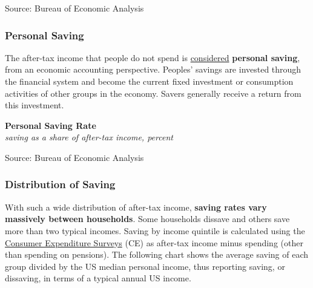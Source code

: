 \documentclass{report}
\makeatletter
\newcommand{\tbllink}[1]{\href{https://raw.githubusercontent.com/bdecon/US-chartbook/master/chartbook/data/#1}{\faTable}}
\newcommand*\short[1]{\expandafter\@gobbletwo\number\numexpr#1\relax}
\newcommand{\dateaxisticks}{
		date coordinates in=x, axis line style={draw=none},
		xmax={2023-10-01},
		max space between ticks=40,	    
		xtick={{1990-01-01}, {1992-01-01}, {1994-01-01}, 
			{1996-01-01}, {1998-01-01}, {2000-01-01}, 
			{2002-01-01}, {2004-01-01}, {2006-01-01},
			{2008-01-01}, {2010-01-01}, {2012-01-01}, {2014-01-01},
		    {2016-01-01}, {2018-01-01}, {2020-01-01}, {2022-01-01}, 
		    {2024-01-01}, {2026-01-01}},
		minor xtick={{1989-01-01}, {1991-01-01}, {1993-01-01},
			{1995-01-01}, {1997-01-01}, {1999-01-01}, 
			{2001-01-01}, {2003-01-01}, {2005-01-01}, {2007-01-01},
		    {2009-01-01}, {2011-01-01}, {2013-01-01}, {2015-01-01},
		    {2017-01-01}, {2019-01-01}, {2021-01-01}, {2023-01-01}, 
		    {2025-01-01}, {2027-01-01}},
		enlarge y limits={0.06}, enlarge x limits={0.01},
		}
\newcommand{\bbar}[2]{extra #1 ticks = {{#2}}, extra #1 tick labels = ,
		extra #1 tick style = {grid=major, grid style={thick, black!25}},}
\newcommand{\stdline}[4]{\addplot[very thick, no markers, color=#1] 
		table [x=#2, y=#3, col sep=comma] {#4};	}
\newcommand{\rbars}{
		\fill[color=black!10] (axis cs:{1990-07-01},\pgfkeysvalueof{/pgfplots/ymin}) rectangle 
			(axis cs:{1991-03-01}, \pgfkeysvalueof{/pgfplots/ymax});
		\fill[color=black!10] (axis cs:{2007-12-01},\pgfkeysvalueof{/pgfplots/ymin}) rectangle 
			(axis cs:{2009-07-01}, \pgfkeysvalueof{/pgfplots/ymax});
		\fill[color=black!10] (axis cs:{2001-03-01},\pgfkeysvalueof{/pgfplots/ymin}) rectangle 
			(axis cs:{2001-11-01}, \pgfkeysvalueof{/pgfplots/ymax});
		\fill[color=black!10] (axis cs:{2020-02-01},\pgfkeysvalueof{/pgfplots/ymin}) rectangle 
			(axis cs:{2020-05-01}, \pgfkeysvalueof{/pgfplots/ymax});}
\makeatother
\begin{document}
{\begin{minipage}{0.76\textwidth}
\footnotesize{Source: Bureau of Economic Analysis} \hfill \tbllink{pcedecomp.csv}
\end{minipage}
\newpage
\begin{minipage}{0.76\textwidth}  
\subsubsection*{Personal Saving}
\small The after-tax income that people do not spend is \href{https://www.bea.gov/index.php/help/glossary/personal-saving}{considered} \textbf{personal saving}, from an economic accounting perspective. Peoples' savings are invested through the financial system and become the current fixed investment or consumption activities of other groups in the economy. Savers generally receive a return from this investment.


\vspace{1mm}

\normalsize \textbf{Personal Saving Rate}\\
\footnotesize{\textit{saving as a share of after-tax income, percent}}
\vspace{3.4cm}

\hspace{4mm} 

\footnotesize{Source: Bureau of Economic Analysis} \hfill \tbllink{psavert.csv}
\vspace{1mm}

\subsubsection*{Distribution of Saving}
\small With such a wide distribution of after-tax income, \textbf{saving rates vary massively between households}. Some households dissave and others save more than two typical incomes. Saving by income quintile is calculated using the \href{https://www.bls.gov/cex/}{Consumer Expenditure Surveys} (CE) as after-tax income minus spending (other than spending on pensions). The following chart shows the average saving of each group divided by the US median personal income, thus reporting saving, or dissaving, in terms of a typical annual US income. 
\vspace{1mm}


\end{minipage}}
\end{document}

